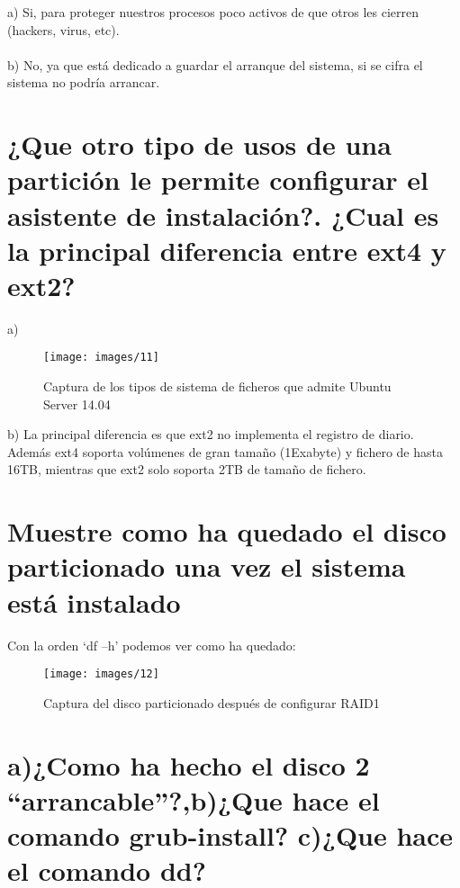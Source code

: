 a) Si, para proteger nuestros procesos poco activos de que otros les cierren (hackers, virus, etc).\\\\
b) No, ya que está dedicado a guardar el arranque del sistema, si se cifra el sistema no podría arrancar.
\clearpage
\section{¿Que otro tipo de usos de una partición le permite configurar el asistente de instalación?. ¿Cual es la principal diferencia entre ext4 y ext2? \cite{11p111}}

a)\begin{figure}[H]
	\centering
	\texttt{[image: images/11]}
	\caption{Captura de los tipos de sistema de ficheros que admite Ubuntu Server 14.04}
	\label{fig:c1101}
\end{figure}


b) La principal diferencia es que ext2 no implementa el registro de diario. Además ext4 soporta volúmenes de gran tamaño (1Exabyte) y fichero de hasta 16TB, mientras que ext2 solo soporta 2TB de tamaño de fichero.
\clearpage
\section{Muestre como ha quedado el disco particionado una vez el sistema está instalado}

Con la orden ‘df –h’ podemos ver como ha quedado:\\
\begin{figure}[H]
	\centering
	\texttt{[image: images/12]}
	\caption{Captura del disco particionado después de configurar RAID1}
	\label{fig:c1201}
\end{figure}

\section{a)¿Como ha hecho el disco 2 “arrancable”?,b)¿Que hace el comando grub-install? c)¿Que hace el comando dd?}

